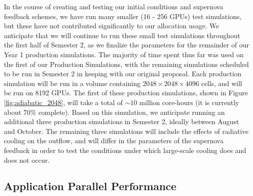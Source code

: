 \documentclass[11pt,letterpaper,english]{article}
\begin{document}
In the course of creating and testing our initial conditions and supernova feedback schemes, we have run many smaller (16 - 256 GPUs) test simulations, but these have not contributed significantly to our allocation usage. We anticipate that we will continue to run these small test simulations throughout the first half of Semester 2, as we finalize the parameters for the remainder of our Year 1 production simulations. The majority of time spent thus far was used on the first of our Production Simulations, with the remaining simulations scheduled to be run in Semester 2 in keeping with our original proposal. Each production simulation will be run in a volume containing $2048\times2048\times4096$ cells, and will be run on 8192 GPUs. The first of these production simulations, shown in Figure \ref{fig:adiabatic_2048}, will take a total of $\sim10$ million core-hours (it is currently about 70\% complete). Based on this simulation, we anticipate running an additional three production simulations in Semester 2, ideally between August and October. The remaining three simulations will include the effects of radiative cooling on the outflow, and will differ in the parameters of the supernova feedback in order to test the conditions under which large-scale cooling does and does not occur.


\subsection{Application Parallel Performance} 
\end{document}
